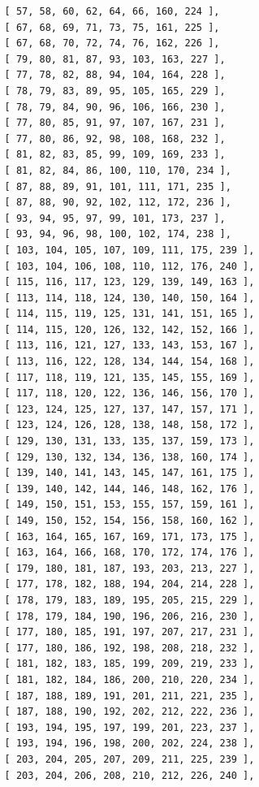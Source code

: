 \documentclass{article}
\begin{document}
\begin{verbatim}
          [ 57, 58, 60, 62, 64, 66, 160, 224 ], 
          [ 67, 68, 69, 71, 73, 75, 161, 225 ], 
          [ 67, 68, 70, 72, 74, 76, 162, 226 ], 
          [ 79, 80, 81, 87, 93, 103, 163, 227 ], 
          [ 77, 78, 82, 88, 94, 104, 164, 228 ], 
          [ 78, 79, 83, 89, 95, 105, 165, 229 ], 
          [ 78, 79, 84, 90, 96, 106, 166, 230 ], 
          [ 77, 80, 85, 91, 97, 107, 167, 231 ], 
          [ 77, 80, 86, 92, 98, 108, 168, 232 ], 
          [ 81, 82, 83, 85, 99, 109, 169, 233 ], 
          [ 81, 82, 84, 86, 100, 110, 170, 234 ], 
          [ 87, 88, 89, 91, 101, 111, 171, 235 ], 
          [ 87, 88, 90, 92, 102, 112, 172, 236 ], 
          [ 93, 94, 95, 97, 99, 101, 173, 237 ], 
          [ 93, 94, 96, 98, 100, 102, 174, 238 ], 
          [ 103, 104, 105, 107, 109, 111, 175, 239 ], 
          [ 103, 104, 106, 108, 110, 112, 176, 240 ], 
          [ 115, 116, 117, 123, 129, 139, 149, 163 ], 
          [ 113, 114, 118, 124, 130, 140, 150, 164 ], 
          [ 114, 115, 119, 125, 131, 141, 151, 165 ], 
          [ 114, 115, 120, 126, 132, 142, 152, 166 ], 
          [ 113, 116, 121, 127, 133, 143, 153, 167 ], 
          [ 113, 116, 122, 128, 134, 144, 154, 168 ], 
          [ 117, 118, 119, 121, 135, 145, 155, 169 ], 
          [ 117, 118, 120, 122, 136, 146, 156, 170 ], 
          [ 123, 124, 125, 127, 137, 147, 157, 171 ], 
          [ 123, 124, 126, 128, 138, 148, 158, 172 ], 
          [ 129, 130, 131, 133, 135, 137, 159, 173 ], 
          [ 129, 130, 132, 134, 136, 138, 160, 174 ], 
          [ 139, 140, 141, 143, 145, 147, 161, 175 ], 
          [ 139, 140, 142, 144, 146, 148, 162, 176 ], 
          [ 149, 150, 151, 153, 155, 157, 159, 161 ], 
          [ 149, 150, 152, 154, 156, 158, 160, 162 ], 
          [ 163, 164, 165, 167, 169, 171, 173, 175 ], 
          [ 163, 164, 166, 168, 170, 172, 174, 176 ], 
          [ 179, 180, 181, 187, 193, 203, 213, 227 ], 
          [ 177, 178, 182, 188, 194, 204, 214, 228 ], 
          [ 178, 179, 183, 189, 195, 205, 215, 229 ], 
          [ 178, 179, 184, 190, 196, 206, 216, 230 ], 
          [ 177, 180, 185, 191, 197, 207, 217, 231 ], 
          [ 177, 180, 186, 192, 198, 208, 218, 232 ], 
          [ 181, 182, 183, 185, 199, 209, 219, 233 ], 
          [ 181, 182, 184, 186, 200, 210, 220, 234 ], 
          [ 187, 188, 189, 191, 201, 211, 221, 235 ], 
          [ 187, 188, 190, 192, 202, 212, 222, 236 ], 
          [ 193, 194, 195, 197, 199, 201, 223, 237 ], 
          [ 193, 194, 196, 198, 200, 202, 224, 238 ], 
          [ 203, 204, 205, 207, 209, 211, 225, 239 ], 
          [ 203, 204, 206, 208, 210, 212, 226, 240 ], 

\end{verbatim}
\end{document}
